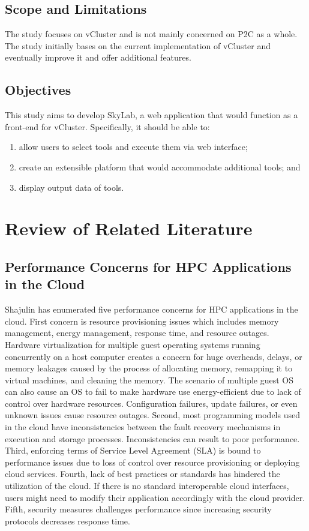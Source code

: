 \documentclass[journal]{./IEEE/IEEEtran}
\begin{document}
    \subsection{Scope and Limitations}
    The study focuses on vCluster and is not mainly concerned on P2C as a whole. The study initially bases on the current implementation of vCluster and eventually improve it and offer additional features\cite {Hermocilla2014}.

    \subsection{Objectives}
    This study aims to develop SkyLab, a web application that would function as a front-end for vCluster. %
	Specifically, it should be able to: 
	\begin{enumerate}
	
		\item allow users to select tools and execute them via web interface; 
        \item create an extensible platform that would accommodate additional tools; and
		\item display output data of tools.
	\end{enumerate}

\section {Review of Related Literature}
    \subsection{Performance Concerns for HPC Applications in the Cloud}
        Shajulin \cite {8521133920130201} has enumerated five performance concerns for HPC applications in the cloud. First concern is resource provisioning issues which includes memory management, \newline \newline energy management, response time, and resource outages.  Hardware virtualization for multiple guest operating systems running concurrently on a host computer creates a concern for huge overheads, delays, or memory leakages caused by the process of allocating memory, remapping it to virtual machines, and cleaning the memory. The scenario of multiple guest OS can also cause an OS to fail to make hardware use energy-efficient due to lack of control over hardware resources. Configuration failures, update failures, or even unknown issues cause resource outages. Second, most programming models used in the cloud have inconsistencies between the fault recovery mechanisms in execution and  storage processes. Inconsistencies can result to poor performance. Third, enforcing terms of Service Level Agreement (SLA) is bound to performance issues due to loss of control over resource provisioning or deploying cloud services. Fourth, lack of best practices or standards has hindered the utilization of the cloud. If there is no standard interoperable cloud interfaces, users might need to modify their application accordingly with the cloud provider. Fifth, security measures challenges performance since increasing security protocols decreases response time.
\end{document}
